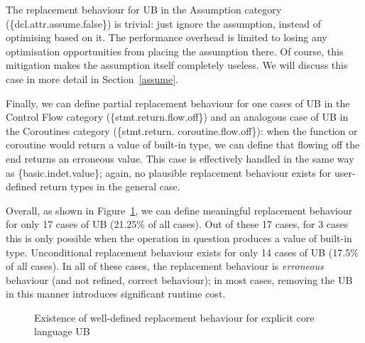 {The replacement behaviour for UB in the Assumption category (\{dcl.attr.assume.false\}) is trivial: just ignore the assumption, instead of optimising based on it. The performance overhead is limited to losing any optimisation opportunities from placing the assumption there. Of course, this mitigation makes the assumption itself completely useless. We will discuss this case in more detail in Section~\ref{assume}.

Finally, we can define partial replacement behaviour for one cases of UB in the Control Flow category  (\{stmt.return.flow.off\}) and an analogous case of UB in the Coroutines category (\{stmt.return.
coroutine.flow.off\}): when the function or coroutine would return a value of built-in type, we can define that flowing off the end returns an erroneous value. This case is effectively handled in the same way as \{basic.indet.value\}; again, no plausible replacement behaviour exists for user-defined return types in the general case.

Overall, as shown in Figure~\ref{piechart_replacement}, we can define meaningful replacement behaviour for only 17 cases of UB (21.25\% of all cases). Out of these 17 cases, for 3 cases this is only possible when the operation in question produces a value of built-in type. Unconditional replacement behaviour exists for only 14 cases of UB (17.5\% of all cases). In all of these cases, the replacement behaviour is \emph{erroneous} behaviour (and not refined, correct behaviour); in most cases, removing the UB in this manner introduces significant runtime cost.

\vspace{5mm} %
\begin{figure}[t!]
    \centering
    \caption{Existence of well-defined replacement behaviour for explicit core language UB}
    \label{piechart_replacement}
\end{figure}


}
